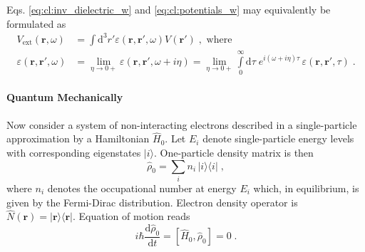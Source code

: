 \documentclass[a4paper,12pt]{article}
\begin{document}
    Eqs. \eqref{eq:cl:inv_dielectric_w} and \eqref{eq:cl:potentials_w} may equivalently be formulated as 
    \begin{equation} \label{eq:cl:result_w}
    \begin{aligned}
        V_\text{ext}(\mathbf{r}, \omega) &= \int\!\! \text{d}^3 r' \varepsilon(\mathbf{r}, \mathbf{r'}, \omega) V(\mathbf{r'})\; ,\text{ where} \\
        \varepsilon(\mathbf{r},\mathbf{r'},\omega) &= \lim_{\eta \to 0+} \varepsilon(\mathbf{r}, \mathbf{r'}, \omega + i\eta) = \lim_{\eta \to 0+} \int\limits_{0}^{\infty} \!\! \text{d}\tau \; e^{i (\omega +i\eta) \tau}\,\varepsilon(\mathbf{r}, \mathbf{r'}, \tau)\; .
    \end{aligned}
    \end{equation}

    \paragraph{Quantum Mechanically} Now consider a system of non-interacting electrons described in a single-particle approximation by a Hamiltonian $\hat H_0$. Let $E_i$ denote single-particle energy levels with corresponding eigenstates $| i \rangle$. One-particle density matrix is then
    \begin{equation} \label{eq:qm:rho_0}
        \hat\rho_0 = \sum_i n_i \, | i \rangle\! \langle i|\; , 
    \end{equation}
    where $n_i$ denotes the occupational number at energy $E_i$ which, in equilibrium, is given by the Fermi-Dirac distribution. Electron density operator is $\hat N(\mathbf{r}) = |\mathbf{r}\rangle \! \langle \mathbf{r}|$. Equation of motion reads
    \begin{equation*}
        i\hbar\frac{\text{d}\hat\rho_0}{\text{d}t} = [\hat H_0, \hat\rho_0 ] = 0\; .
    \end{equation*}
    
\end{document}
